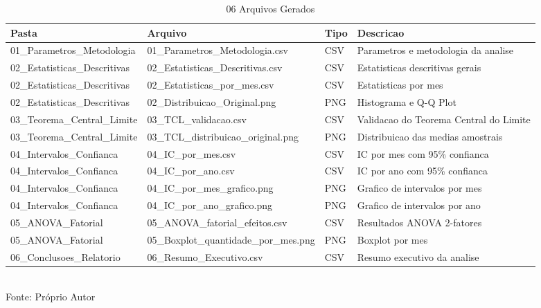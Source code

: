 \begin{table}[H]
\centering
\small
\caption{06 Arquivos Gerados}
\label{tab:08_06_Conclusoes_Relatorio}
\begin{tabular}{|p{2.5cm}|p{2.5cm}|p{1cm}|p{4cm}|}
\hline
\textbf{Pasta} & \textbf{Arquivo} & \textbf{Tipo} & \textbf{Descricao} \\
\hline
01\_Parametros\_Metodologia & 01\_Parametros\_Metodologia.csv & CSV & Parametros e metodologia da analise \\
02\_Estatisticas\_Descritivas & 02\_Estatisticas\_Descritivas.csv & CSV & Estatisticas descritivas gerais \\
02\_Estatisticas\_Descritivas & 02\_Estatisticas\_por\_mes.csv & CSV & Estatisticas por mes \\
02\_Estatisticas\_Descritivas & 02\_Distribuicao\_Original.png & PNG & Histograma e Q-Q Plot \\
03\_Teorema\_Central\_Limite & 03\_TCL\_validacao.csv & CSV & Validacao do Teorema Central do Limite \\
03\_Teorema\_Central\_Limite & 03\_TCL\_distribuicao\_original.png & PNG & Distribuicao das medias amostrais \\
04\_Intervalos\_Confianca & 04\_IC\_por\_mes.csv & CSV & IC por mes com 95\% confianca \\
04\_Intervalos\_Confianca & 04\_IC\_por\_ano.csv & CSV & IC por ano com 95\% confianca \\
04\_Intervalos\_Confianca & 04\_IC\_por\_mes\_grafico.png & PNG & Grafico de intervalos por mes \\
04\_Intervalos\_Confianca & 04\_IC\_por\_ano\_grafico.png & PNG & Grafico de intervalos por ano \\
05\_ANOVA\_Fatorial & 05\_ANOVA\_fatorial\_efeitos.csv & CSV & Resultados ANOVA 2-fatores \\
05\_ANOVA\_Fatorial & 05\_Boxplot\_quantidade\_por\_mes.png & PNG & Boxplot por mes \\
06\_Conclusoes\_Relatorio & 06\_Resumo\_Executivo.csv & CSV & Resumo executivo da analise \\
\hline
\end{tabular}
\\ \small Fonte: Próprio Autor
\end{table}
